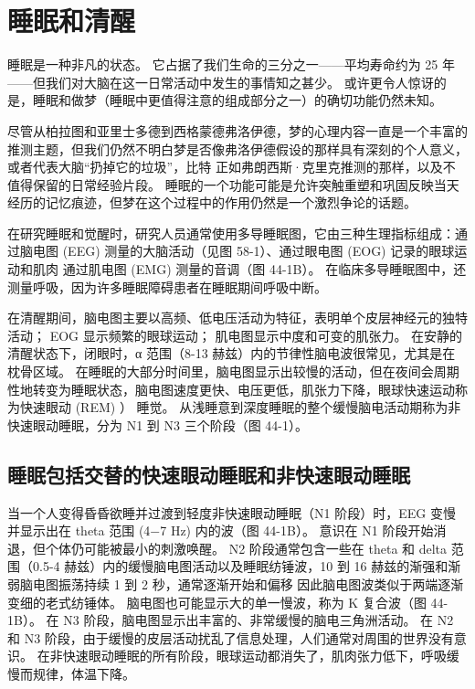 \chapter{睡眠和清醒} \label{chap:chap44}

睡眠是一种非凡的状态。 它占据了我们生命的三分之一——平均寿命约为 25 年——但我们对大脑在这一日常活动中发生的事情知之甚少。 或许更令人惊讶的是，睡眠和做梦（睡眠中更值得注意的组成部分之一）的确切功能仍然未知。

尽管从柏拉图和亚里士多德到西格蒙德弗洛伊德，梦的心理内容一直是一个丰富的推测主题，但我们仍然不明白梦是否像弗洛伊德假设的那样具有深刻的个人意义，或者代表大脑“扔掉它的垃圾”，比特 正如弗朗西斯·克里克推测的那样，以及不值得保留的日常经验片段。 睡眠的一个功能可能是允许突触重塑和巩固反映当天经历的记忆痕迹，但梦在这个过程中的作用仍然是一个激烈争论的话题。

在研究睡眠和觉醒时，研究人员通常使用多导睡眠图，它由三种生理指标组成：通过脑电图 (EEG) 测量的大脑活动（见图 58-1）、通过眼电图 (EOG) 记录的眼球运动和肌肉 通过肌电图 (EMG) 测量的音调（图 44-1B）。 在临床多导睡眠图中，还测量呼吸，因为许多睡眠障碍患者在睡眠期间呼吸中断。

在清醒期间，脑电图主要以高频、低电压活动为特征，表明单个皮层神经元的独特活动； EOG 显示频繁的眼球运动； 肌电图显示中度和可变的肌张力。 在安静的清醒状态下，闭眼时，α 范围（8-13 赫兹）内的节律性脑电波很常见，尤其是在枕骨区域。 在睡眠的大部分时间里，脑电图显示出较慢的活动，但在夜间会周期性地转变为睡眠状态，脑电图速度更快、电压更低，肌张力下降，眼球快速运动称为快速眼动 (REM) ） 睡觉。 从浅睡意到深度睡眠的整个缓慢脑电活动期称为非快速眼动睡眠，分为 N1 到 N3 三个阶段（图 44-1）。


\section{睡眠包括交替的快速眼动睡眠和非快速眼动睡眠}

当一个人变得昏昏欲睡并过渡到轻度非快速眼动睡眠（N1 阶段）时，EEG 变慢并显示出在 theta 范围 (4−7 Hz) 内的波（图 44-1B）。 意识在 N1 阶段开始消退，但个体仍可能被最小的刺激唤醒。 N2 阶段通常包含一些在 theta 和 delta 范围（0.5-4 赫兹）内的缓慢脑电图活动以及睡眠纺锤波，10 到 16 赫兹的渐强和渐弱脑电图振荡持续 1 到 2 秒，通常逐渐开始和偏移 因此脑电图波类似于两端逐渐变细的老式纺锤体。 脑电图也可能显示大的单一慢波，称为 K 复合波（图 44-1B）。 在 N3 阶段，脑电图显示出丰富的、非常缓慢的脑电三角洲活动。 在 N2 和 N3 阶段，由于缓慢的皮层活动扰乱了信息处理，人们通常对周围的世界没有意识。 在非快速眼动睡眠的所有阶段，眼球运动都消失了，肌肉张力低下，呼吸缓慢而规律，体温下降。

